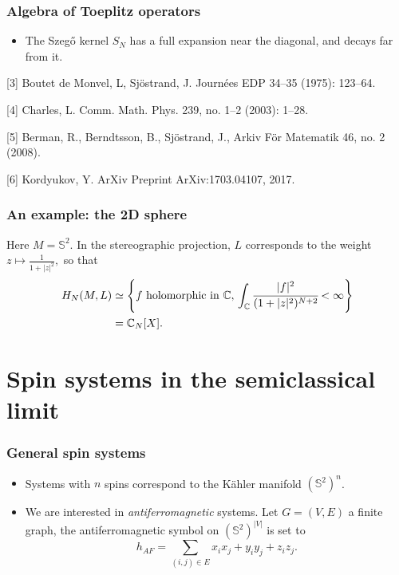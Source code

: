 \documentclass[mathserif]{beamer}
\begin{document}
\begin{frame}
  \frametitle{Algebra of Toeplitz operators}
  \begin{itemize}
  \item The Szeg\H{o} kernel $S_N$ has a full expansion near the
    diagonal, and decays far from it.
  \end{itemize}
\vspace{2em}

\small{[3] Boutet de Monvel, L, Sjöstrand, J. Journées EDP 34–35 (1975): 123–64.

[4] Charles, L. Comm. Math. Phys. 239, no. 1–2 (2003): 1–28.

[5] Berman, R., Berndtsson, B., Sjöstrand, J.,  Arkiv För Matematik
46, no. 2 (2008).

[6] Kordyukov, Y. ArXiv Preprint ArXiv:1703.04107, 2017.
}

 

\end{frame}

\begin{frame}
  \frametitle{An example: the 2D sphere}
  Here $M=\mathbb{S}^2$. In the stereographic projection, $L$
  corresponds to the weight $z\mapsto \frac{1}{1+|z|^2},$ so
  that \begin{align*}H_N(M,L)&\simeq \left\{f\text{ holomorphic in
                               $\mathbb{C}$},\,\int_{\mathbb{C}}\cfrac{|f|^2}{(1+|z|^2)^{N+2}}<\infty\right\}\\
                             &=\mathbb{C}_N[X].\end{align*}
\end{frame}


\section{Spin systems in the semiclassical limit}
\begin{frame}
  \frametitle{General spin systems}
\begin{itemize}
  \item Systems with $n$ spins correspond to the K\"ahler manifold
  $(\mathbb{S}^2)^n$.

\item We are interested in \emph{antiferromagnetic} systems. Let $G=(V,E)$
  a finite graph, the antiferromagnetic symbol on
  $(\mathbb{S}^2)^{|V|}$ is set to $$h_{AF}=\sum_{(i,j)\in
    E}x_ix_j+y_iy_j+z_iz_j.$$
\end{itemize}
\end{frame}
\end{document}
